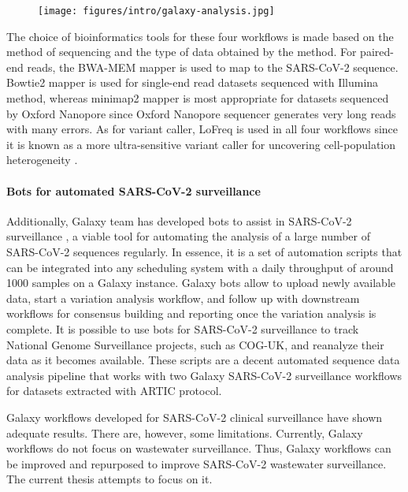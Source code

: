         \begin{figure}[ht!]
        	\centering
            \texttt{[image: figures/intro/galaxy-analysis.jpg]}
            \label{fig:intro:galaxy-effort}
        \end{figure}
        
        The choice of bioinformatics tools for these four workflows is made based on the method of sequencing and the type of data obtained by the method. For paired-end reads, the BWA-MEM \cite{li2013,burrows} mapper is used to map to the SARS-CoV-2 sequence. Bowtie2 \cite{ultrafast,langmead2012} mapper is used for single-end read datasets sequenced with Illumina method, whereas minimap2 \cite{burrows,li2018} mapper is most appropriate for datasets sequenced by Oxford Nanopore since Oxford Nanopore sequencer generates very long reads with many errors. As for variant caller, LoFreq is used in all four workflows since it is known as a more ultra-sensitive variant caller for uncovering cell-population heterogeneity \cite{lofreq}.

        \paragraph{Bots for automated SARS-CoV-2 surveillance } 
        
        Additionally, Galaxy team has developed bots to assist in SARS-CoV-2 surveillance \cite{bots2022}, a viable tool for automating the analysis of a large number of SARS-CoV-2 sequences regularly. In essence, it is a set of automation scripts that can be integrated into any scheduling system with a daily throughput of around 1000 samples on a Galaxy instance. Galaxy bots allow to upload newly available data, start a variation analysis workflow, and follow up with downstream workflows for consensus building and reporting once the variation analysis is complete. It is possible to use bots for SARS-CoV-2 surveillance to track National Genome Surveillance projects, such as COG-UK, and reanalyze their data as it becomes available. These scripts are a decent automated sequence data analysis pipeline that works with two Galaxy SARS-CoV-2 surveillance workflows for datasets extracted with ARTIC protocol. 
        
        Galaxy workflows developed for SARS-CoV-2 clinical surveillance have shown adequate results. There are, however, some limitations. Currently, Galaxy workflows do not focus on wastewater surveillance. Thus, Galaxy workflows can be improved and repurposed to improve SARS-CoV-2 wastewater surveillance. The current thesis attempts to focus on it.

